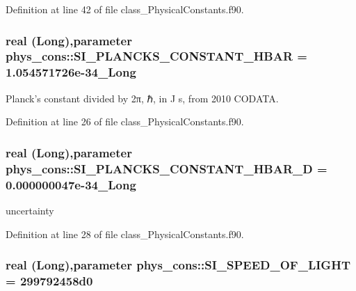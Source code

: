Definition at line 42 of file class\_\-PhysicalConstants.f90.

\hypertarget{namespacephys__cons_ab49e79c21c913c5857dedf2c555d2c21}{
\subsubsection[{SI\_\-PLANCKS\_\-CONSTANT\_\-HBAR}]{\setlength{\rightskip}{0pt plus 5cm}real (Long),parameter {\bf phys\_\-cons::SI\_\-PLANCKS\_\-CONSTANT\_\-HBAR} = 1.054571726e-\/34\_\-Long}}
\label{namespacephys__cons_ab49e79c21c913c5857dedf2c555d2c21}


Planck's constant divided by 2π, ℏ, in J s, from 2010 CODATA. 



Definition at line 26 of file class\_\-PhysicalConstants.f90.

\hypertarget{namespacephys__cons_af8ab82739d58ac3a1e1d9c97d3cfb4da}{
\subsubsection[{SI\_\-PLANCKS\_\-CONSTANT\_\-HBAR\_\-D}]{\setlength{\rightskip}{0pt plus 5cm}real (Long),parameter {\bf phys\_\-cons::SI\_\-PLANCKS\_\-CONSTANT\_\-HBAR\_\-D} = 0.000000047e-\/34\_\-Long}}
\label{namespacephys__cons_af8ab82739d58ac3a1e1d9c97d3cfb4da}


uncertainty 



Definition at line 28 of file class\_\-PhysicalConstants.f90.

\hypertarget{namespacephys__cons_ae265fad966cfc841f9a073a52955d742}{
\subsubsection[{SI\_\-SPEED\_\-OF\_\-LIGHT}]{\setlength{\rightskip}{0pt plus 5cm}real (Long),parameter {\bf phys\_\-cons::SI\_\-SPEED\_\-OF\_\-LIGHT} = 299792458d0}}
\label{namespacephys__cons_ae265fad966cfc841f9a073a52955d742}


